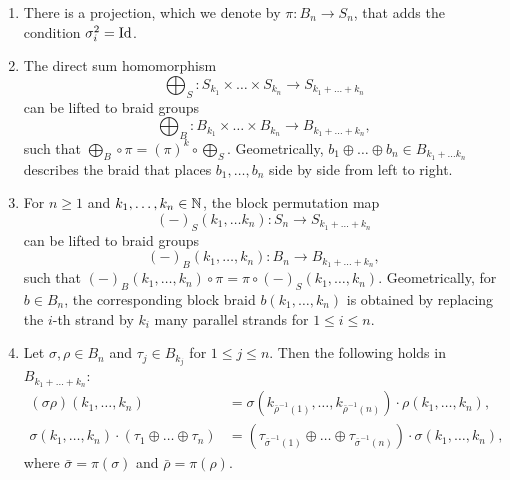    \begin{rem}\label{braidfacts}
        \begin{enumerate}
            \item There is a projection, which we denote by $\pi \colon B_n \to
            S_n$, that adds the condition $\sigma_i^2 = \operatorname{Id}$.
            \item The direct sum homomorphism 
            \[
                \bigoplus_S \colon S_{k_1} \times \dots \times S_{k_n} \to S_{k_1 + \dots + k_n}
            \]
            can be lifted to braid groups
            \[
                \bigoplus_B \colon B_{k_1} \times \dots \times B_{k_n} \to B_{k_1 + \dots + k_n},
            \]
            such that $ \bigoplus_B \circ  \pi = (\pi)^k \circ \bigoplus_S$.
            Geometrically, $b_1 \oplus \dots \oplus b_n \in B_{k_1 + \dots k_n}$
            describes the braid that places $b_1, \dots, b_n$ side by side from
            left to right.
            \item For $n \geq 1$ and $k_1, \dots, k_n \in \mathbb{N}$, the block
            permutation map
            \[
                (-)_S(k_1, \dots k_n) \colon S_n \to S_{k_1 + \dots + k_n}
            \] can be lifted to braid groups
            \[
                (-)_B(k_1, \dots, k_n) \colon B_n \to B_{k_1 + \dots + k_n},
            \]
            such that $(-)_B(k_1, \dots, k_n) \circ \pi = \pi \circ (-)_S(k_1,
            \dots, k_n)$. Geometrically, for $b \in B_n$, the corresponding
            block braid $b(k_1, \dots, k_n)$ is obtained by replacing the $i$-th
            strand by $k_i$ many parallel strands for $1 \leq i \leq n$.
            \item Let $\sigma, \rho \in B_n$ and $\tau_j \in B_{k_j}$ for $1
            \leq j \leq n$. Then the following holds in $B_{k_1 + \dots + k_n}$:
            \begin{align*}
                (\sigma \rho)(k_1, \dots, k_n) &= \sigma(k_{\bar{\rho}^{-1}(1)}, \dots, k_{\bar{\rho}^{-1}(n)}) \cdot \rho(k_1, \dots, k_n), \\
                \sigma(k_1, \dots, k_n) \cdot (\tau_1 \oplus \dots \oplus \tau_n) &= \left(\tau_{\bar{\sigma}^{-1}(1)} \oplus \dots \oplus \tau_{\bar{\sigma}^{-1}(n)}\right) \cdot \sigma(k_1, \dots, k_n),
            \end{align*}
            where $\bar{\sigma} = \pi(\sigma)$ and $\bar{\rho} =   \pi(\rho)$.
        \end{enumerate}
    \end{rem}
    
